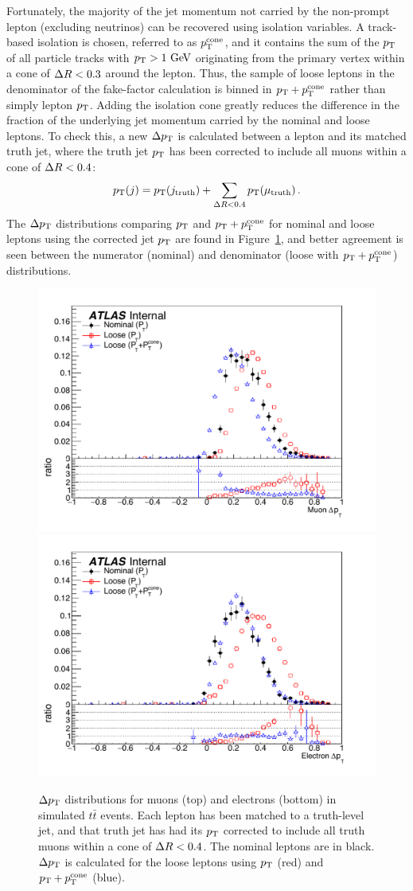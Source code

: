Fortunately, the majority of the jet momentum not carried by the non-prompt lepton (excluding neutrinos) can be recovered using isolation variables.
A track-based isolation is chosen, referred to as $p_{\mathrm{T}}^{\textrm{cone}}$, and it contains the sum of the $p_{\mathrm{T}}$ of all particle tracks with $\pt > 1\gev$ originating from the primary vertex within a cone of $\Delta R < 0.3$ around the lepton.
Thus, the sample of loose leptons in the denominator of the fake-factor calculation is binned in $p_{\mathrm{T}}+p_{\mathrm{T}}^{\textrm{cone}}$ rather than simply lepton $p_{\mathrm{T}}$.
Adding the isolation cone greatly reduces the difference in the fraction of the underlying jet momentum carried by the nominal and loose leptons.
To check this, a new $\Delta p_{\mathrm{T}}$ is calculated between a lepton and its matched truth jet, where the truth jet $p_{\mathrm{T}}$ has been corrected to include all muons within a cone of $\Delta R < 0.4$:
\begin{equation}
\pt(j) = \pt(j_{\textrm{truth}})+\sum\limits_{\deltar < 0.4}\pt(\mu_{\textrm{truth}})\,.
\label{eq:ssww13tev_ff_jet_corr}
\end{equation}
The $\Delta p_{\mathrm{T}}$ distributions comparing $p_{\mathrm{T}}$ and $p_{\mathrm{T}}+p_{\mathrm{T}}^{\textrm{cone}}$ for nominal and loose leptons using the corrected jet $p_{\mathrm{T}}$ are found in Figure~\ref{fig:ssww13tev_ff_deltapt_ptcone}, and better agreement is seen between the numerator (nominal) and denominator (loose with $p_{\mathrm{T}}+p_{\mathrm{T}}^{\textrm{cone}}$) distributions.

\begin{figure}[htbp]
  \centering
  \includegraphics[width=.6\textwidth]{figs/ssww_13tev/backgrounds/ff/dpt_muon_ttbar}\\
  \includegraphics[width=.6\textwidth]{figs/ssww_13tev/backgrounds/ff/dpt_elec_ttbar}
  \caption{$\Delta p_{\mathrm{T}}$ distributions for muons (top) and electrons (bottom) in simulated $t\bar{t}$ events.  Each lepton has been matched to a truth-level jet, and that truth jet has had its $p_{\mathrm{T}}$ corrected to include all truth muons within a cone of $\Delta R < 0.4$.  The nominal leptons are in black. $\Delta p_{\mathrm{T}}$ is calculated for the loose leptons using $p_{\mathrm{T}}$ (red) and $p_{\mathrm{T}}+p_{\mathrm{T}}^{\textrm{cone}}$ (blue).}
  \label{fig:ssww13tev_ff_deltapt_ptcone}
\end{figure}


